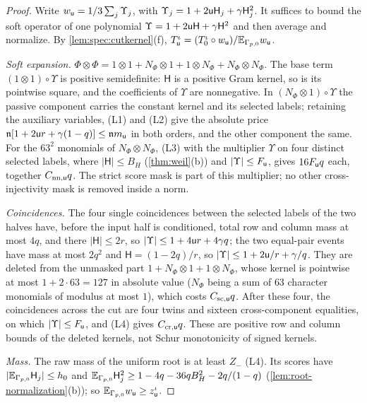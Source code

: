 \begin{proof}
Write $w_\mathsf u=1/3\sum_j\Upsilon_j$, with
$\Upsilon_j=1+2\mathsf u\mathsf H_{j}+\gamma\mathsf H_{j}^2$. It suffices to bound the soft
operator of one polynomial $\Upsilon=1+2\mathsf u\mathsf H+\gamma\mathsf H^2$
and then average and normalize. By \cref{lem:spec:cutkernel}(f),
$T^\iota_\mathsf u=(T^\iota_0\circ w_\mathsf u)/\mathbb E_{\Gamma_{p,0}}w_\mathsf u$.

\emph{Soft expansion.} $\Phi\otimes\Phi=1\otimes1+N_\Phi\otimes1+1\otimes N_\Phi+N_\Phi\otimes N_\Phi$.
The base term $(1\otimes1)\circ\Upsilon$ is positive semidefinite: $\mathsf H$ is a positive Gram kernel,
so is its pointwise square, and the coefficients of $\Upsilon$ are nonnegative. In
$(N_\Phi\otimes1)\circ\Upsilon$ the passive component carries the constant kernel and its selected
labels; retaining the auxiliary variables, (L1) and (L2) give the absolute price
$\mathfrak n[1+2\mathsf u r+\gamma(1-q)]\le\mathfrak nm_\mathsf u$ in both orders, and the other
component the same. For the $63^2$ monomials of $N_\Phi\otimes N_\Phi$, (L3) with the
multiplier $\Upsilon$ on four distinct selected labels, where $|\mathsf H|\le B_H$ (\cref{thm:weil}(b)) and
$|\Upsilon|\le F_\mathsf u$, gives $16F_\mathsf u q$ each, together $C_{\rm nn,\mathsf u}q$. The strict score
mask is part of this multiplier; no other cross-injectivity mask is removed inside a norm.

\emph{Coincidences.} The four single coincidences between the selected labels of the two
halves have, before the input half is conditioned, total row and column mass at most $4q$,
and there $|\mathsf H|\le2r$, so $|\Upsilon|\le1+4\mathsf u r+4\gamma q$; the two equal-pair events have mass
at most $2q^2$ and $\mathsf H=(1-2q)/r$, so $|\Upsilon|\le1+2\mathsf u/r+\gamma/q$. They are deleted from the
unmasked part $1+N_\Phi\otimes1+1\otimes N_\Phi$, whose kernel is pointwise
at most $1+2\cdot63=127$ in absolute value ($N_\Phi$ being a sum of $63$
character monomials of modulus at most $1$), which costs $C_{\rm sc,\mathsf u}q$. After these four, the coincidences across the cut are four twins and
sixteen cross-component equalities, on which $|\Upsilon|\le F_\mathsf u$, and (L4) gives
$C_{\rm cr,\mathsf u}q$. These are positive row and column bounds of the deleted kernels, not
Schur monotonicity of signed kernels.

\emph{Mass.} The raw mass of the uniform root is at least $Z_-$ (L4). Its scores have
$|\mathbb E_{\Gamma_{p,0}}\mathsf H_{j}|\le h_0$ and $\mathbb E_{\Gamma_{p,0}}\mathsf H_{j}^2\ge1-4q-36qB_H^2-2q/(1-q)$
(\cref{lem:root-normalization}(b)); so $\mathbb E_{\Gamma_{p,0}}w_\mathsf u\ge z^\iota_\mathsf u$.


\end{proof}
